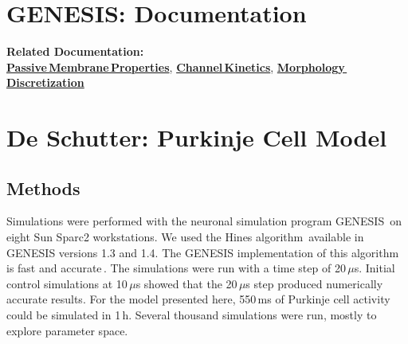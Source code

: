 \documentclass[12pt]{article}
\begin{document}
\section*{GENESIS: Documentation}

{\bf Related Documentation:}\\
\href{../pub-purkinje-deschutter1-passive/pub-purkinje-deschutter1-passive.tex}{\bf Passive\,Membrane\,Properties},
\href{../pub-purkinje-deschutter1-kinetics/pub-purkinje-deschutter1-kinetics.tex}{\bf Channel\,Kinetics},
\href{../pub-purkinje-deschutter1-discretization/pub-purkinje-deschutter1-discretization.tex}{\bf Morphology\,Discretization}

\section*{De Schutter: Purkinje Cell Model}

\subsection*{Methods}

Simulations were performed with the neuronal simulation program
GENESIS\,\cite{Wilson:1989ff} on eight Sun Sparc2 workstations.
We used the Hines algorithm\,\cite{hines84:_effic} available in
GENESIS versions 1.3 and 1.4. The GENESIS implementation of
this algorithm is fast and accurate\,\cite{bhalla92:_rallp}. The simulations
were run with a time step of 20\,$\mu$s. Initial control simulations
at 10\,$\mu$s showed that the 20\,$\mu$s step produced numerically accurate
results. For the model presented here, 550\,ms of Purkinje cell
activity could be simulated in 1\,h. Several thousand simulations
were run, mostly to explore parameter space.



\end{document}
